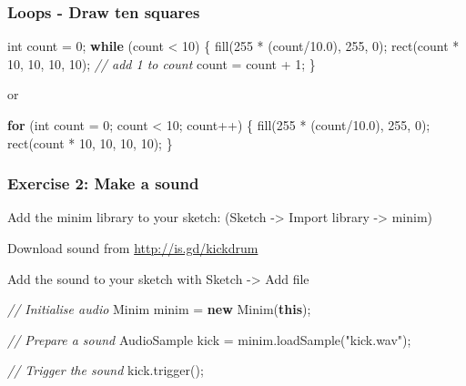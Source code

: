 \documentclass[ignorenonframetext,]{beamer}
\newenvironment{Shaded}{}{}
\newcommand{\KeywordTok}[1]{\textcolor[rgb]{0.00,0.44,0.13}{\textbf{{#1}}}}
\newcommand{\DataTypeTok}[1]{\textcolor[rgb]{0.56,0.13,0.00}{{#1}}}
\newcommand{\DecValTok}[1]{\textcolor[rgb]{0.25,0.63,0.44}{{#1}}}
\newcommand{\FloatTok}[1]{\textcolor[rgb]{0.25,0.63,0.44}{{#1}}}
\newcommand{\StringTok}[1]{\textcolor[rgb]{0.25,0.44,0.63}{{#1}}}
\newcommand{\CommentTok}[1]{\textcolor[rgb]{0.38,0.63,0.69}{\textit{{#1}}}}
\newcommand{\FunctionTok}[1]{\textcolor[rgb]{0.02,0.16,0.49}{{#1}}}
\newcommand{\NormalTok}[1]{{#1}}
\begin{document}
\begin{frame}[fragile]\frametitle{Loops - Draw ten squares}

\begin{Shaded}
\begin{Highlighting}[]
\DataTypeTok{int} \NormalTok{count = }\DecValTok{0}\NormalTok{;}
\KeywordTok{while} \NormalTok{(count < }\DecValTok{10}\NormalTok{) \{}
  \FunctionTok{fill}\NormalTok{(}\DecValTok{255} \NormalTok{* (count/}\FloatTok{10.0}\NormalTok{), }\DecValTok{255}\NormalTok{, }\DecValTok{0}\NormalTok{);}
  \FunctionTok{rect}\NormalTok{(count * }\DecValTok{10}\NormalTok{, }\DecValTok{10}\NormalTok{, }\DecValTok{10}\NormalTok{, }\DecValTok{10}\NormalTok{);}
  \CommentTok{// add 1 to count}
  \NormalTok{count = count + }\DecValTok{1}\NormalTok{;}
\NormalTok{\} }
\end{Highlighting}
\end{Shaded}

or

\begin{Shaded}
\begin{Highlighting}[]
\KeywordTok{for} \NormalTok{(}\DataTypeTok{int} \NormalTok{count = }\DecValTok{0}\NormalTok{; count < }\DecValTok{10}\NormalTok{; count++) \{}
  \FunctionTok{fill}\NormalTok{(}\DecValTok{255} \NormalTok{* (count/}\FloatTok{10.0}\NormalTok{), }\DecValTok{255}\NormalTok{, }\DecValTok{0}\NormalTok{);}
  \FunctionTok{rect}\NormalTok{(count * }\DecValTok{10}\NormalTok{, }\DecValTok{10}\NormalTok{, }\DecValTok{10}\NormalTok{, }\DecValTok{10}\NormalTok{);}
\NormalTok{\} }
\end{Highlighting}
\end{Shaded}

\end{frame}

\begin{frame}[fragile]\frametitle{Exercise 2: Make a sound}

Add the minim library to your sketch: (Sketch -\textgreater{} Import
library -\textgreater{} minim)

Download sound from \url{http://is.gd/kickdrum}

Add the sound to your sketch with Sketch -\textgreater{} Add file

\begin{Shaded}
\begin{Highlighting}[]
\CommentTok{// Initialise audio}
\NormalTok{Minim minim = }\KeywordTok{new} \FunctionTok{Minim}\NormalTok{(}\KeywordTok{this}\NormalTok{);}

\CommentTok{// Prepare a sound}
\NormalTok{AudioSample kick = minim.}\FunctionTok{loadSample}\NormalTok{(}\StringTok{"kick.wav"}\NormalTok{);}

\CommentTok{// Trigger the sound}
\NormalTok{kick.}\FunctionTok{trigger}\NormalTok{();}
\end{Highlighting}
\end{Shaded}

\end{frame}
\end{document}

